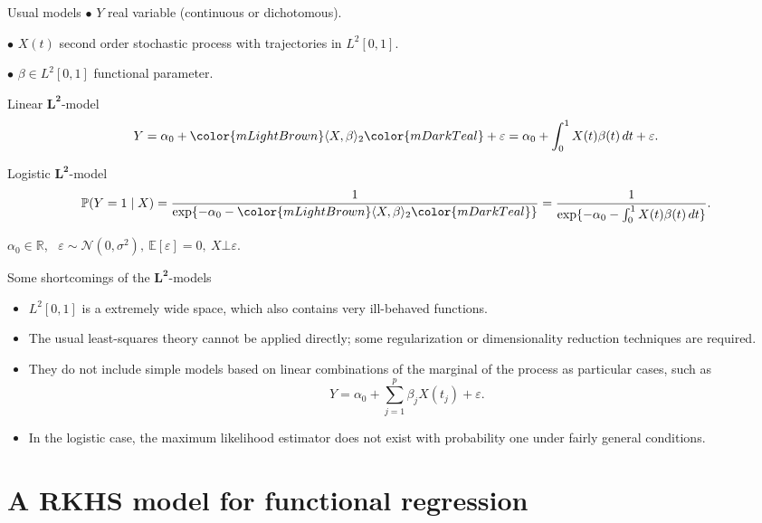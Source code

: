 \documentclass[10pt, english, professionalfonts]{beamer}
\newcommand\maroon[1]{\color{mLightBrown}#1\color{mDarkTeal}}
\begin{document}
\begin{frame}{Usual models}
  \(\bullet\) \(Y\) real variable (continuous or dichotomous).

  \(\bullet\) \(X(t)\) second order stochastic process with trajectories in \(L^2[0, 1]\).

  \(\bullet\) \(\beta \in L^2[0,1]\) \maroon{functional parameter}.

  \vspace{1em}

\begin{block}{Linear \(\bm{L^2}\)-model}
  \[
    Y = \alpha_0 + \maroon{\langle X, \beta \rangle_2} + \varepsilon = \alpha_0 + \int_0^1 X(t)\beta(t)\, dt + \varepsilon.
  \]
\end{block}
\begin{block}{Logistic \(\bm{L^2}\)-model}
    \[
    \mathbb P (Y=1\mid X) = \frac{1}{\exp\{-\alpha_0 - \maroon{\langle X, \beta\rangle_2}\}} = \frac{1}{\exp\{-\alpha_0 - \int_0^1 X(t)\beta(t)\, dt\}}.
  \]
\end{block}
  \(\alpha_0\in\mathbb R\), \ \(\varepsilon \sim \mathcal N(0, \sigma^2), \ \mathbb E[\varepsilon]=0, \ X \bot \varepsilon\).
\end{frame}


\begin{frame}{Some shortcomings of the \(\bm{L^2}\)-models}
  \begin{itemize}
    \item \(L^2[0, 1]\) is a extremely wide space, which also contains very ill-behaved functions.
    \item The usual least-squares theory cannot be applied directly; some regularization or dimensionality reduction techniques are required.
    \item They do not include simple models based on linear combinations of the marginal of the process as particular cases, such as
    \[
      Y = \alpha_0 + \sum_{j=1}^p \beta_j X(t_j) + \varepsilon.
    \]
    \item In the logistic case, the maximum likelihood estimator does not exist with probability one under fairly general conditions.
  \end{itemize}
\end{frame}

\section{A RKHS model for functional regression}
\end{document}
